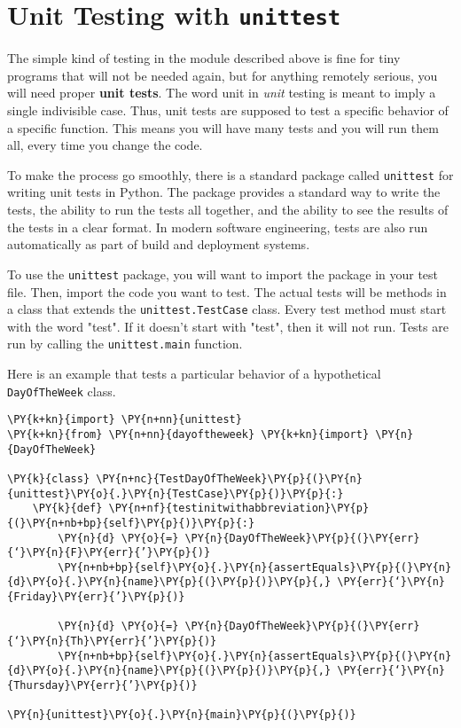 \section{Unit Testing with \texttt{unittest}}


The simple kind of testing in the module described above is fine for tiny programs that will not be needed again, but for anything remotely serious, you will need proper \textbf{unit tests}.  The word unit in \emph{unit} testing is meant to imply a single indivisible case.  Thus, unit tests are supposed to test a specific behavior of a specific function.  This means you will have many tests and you will run them all, every time you change the code.  


To make the process go smoothly, there is a standard package  called \texttt{unittest} for writing unit tests in Python.  The package provides a standard way to write the tests, the ability to run the tests all together, and the ability to see the results of the tests in a clear format.  In modern software engineering, tests are also run automatically as part of build and deployment systems.


To use the \texttt{unittest} package, you will want to import the package in your test file.
Then, import the code you want to test.
The actual tests will be methods in a class that extends the \texttt{unittest.TestCase} class.
Every test method must start with the word "test".  If it doesn’t start with "test", then it will not run.
Tests are run by calling the \texttt{unittest.main} function.


Here is an example that tests a particular behavior of a hypothetical \texttt{DayOfTheWeek} class.


\begin{Verbatim}[commandchars=\\\{\}]
\PY{k+kn}{import} \PY{n+nn}{unittest}
\PY{k+kn}{from} \PY{n+nn}{dayoftheweek} \PY{k+kn}{import} \PY{n}{DayOfTheWeek}

\PY{k}{class} \PY{n+nc}{TestDayOfTheWeek}\PY{p}{(}\PY{n}{unittest}\PY{o}{.}\PY{n}{TestCase}\PY{p}{)}\PY{p}{:}
    \PY{k}{def} \PY{n+nf}{testinitwithabbreviation}\PY{p}{(}\PY{n+nb+bp}{self}\PY{p}{)}\PY{p}{:}
        \PY{n}{d} \PY{o}{=} \PY{n}{DayOfTheWeek}\PY{p}{(}\PY{err}{‘}\PY{n}{F}\PY{err}{’}\PY{p}{)}
        \PY{n+nb+bp}{self}\PY{o}{.}\PY{n}{assertEquals}\PY{p}{(}\PY{n}{d}\PY{o}{.}\PY{n}{name}\PY{p}{(}\PY{p}{)}\PY{p}{,} \PY{err}{‘}\PY{n}{Friday}\PY{err}{’}\PY{p}{)}

        \PY{n}{d} \PY{o}{=} \PY{n}{DayOfTheWeek}\PY{p}{(}\PY{err}{‘}\PY{n}{Th}\PY{err}{’}\PY{p}{)}
        \PY{n+nb+bp}{self}\PY{o}{.}\PY{n}{assertEquals}\PY{p}{(}\PY{n}{d}\PY{o}{.}\PY{n}{name}\PY{p}{(}\PY{p}{)}\PY{p}{,} \PY{err}{‘}\PY{n}{Thursday}\PY{err}{’}\PY{p}{)}     

\PY{n}{unittest}\PY{o}{.}\PY{n}{main}\PY{p}{(}\PY{p}{)}
\end{Verbatim}


